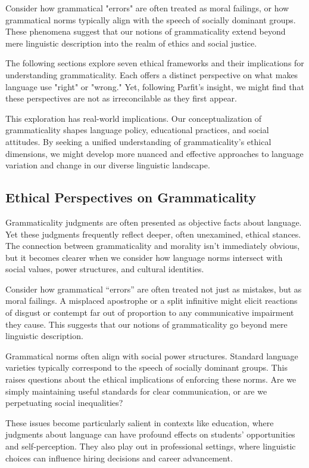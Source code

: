 Consider how grammatical "errors" are often treated as moral failings, or how grammatical norms typically align with the speech of socially dominant groups. These phenomena suggest that our notions of grammaticality extend beyond mere linguistic description into the realm of ethics and social justice.

The following sections explore seven ethical frameworks and their implications for understanding grammaticality. Each offers a distinct perspective on what makes language use "right" or "wrong." Yet, following Parfit's insight, we might find that these perspectives are not as irreconcilable as they first appear.

This exploration has real-world implications. Our conceptualization of grammaticality shapes language policy, educational practices, and social attitudes. By seeking a unified understanding of grammaticality's ethical dimensions, we might develop more nuanced and effective approaches to language variation and change in our diverse linguistic landscape.

\subsection{Ethical Perspectives on Grammaticality}

Grammaticality judgments are often presented as objective facts about language. Yet these judgments frequently reflect deeper, often unexamined, ethical stances. The connection between grammaticality and morality isn't immediately obvious, but it becomes clearer when we consider how language norms intersect with social values, power structures, and cultural identities.

Consider how grammatical ``errors'' are often treated not just as mistakes, but as moral failings. A misplaced apostrophe or a split infinitive might elicit reactions of disgust or contempt far out of proportion to any communicative impairment they cause. This suggests that our notions of grammaticality go beyond mere linguistic description.

Grammatical norms often align with social power structures. Standard language varieties typically correspond to the speech of socially dominant groups. This raises questions about the ethical implications of enforcing these norms. Are we simply maintaining useful standards for clear communication, or are we perpetuating social inequalities?

These issues become particularly salient in contexts like education, where judgments about language can have profound effects on students' opportunities and self-perception. They also play out in professional settings, where linguistic choices can influence hiring decisions and career advancement.

